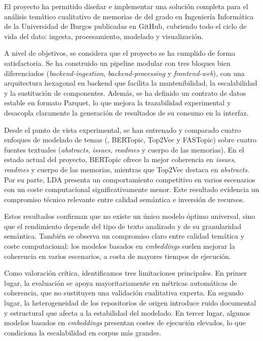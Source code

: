 
El proyecto \nombreProyecto ha permitido diseñar e implementar una solución
completa para el análisis temático cualitativo de memorias de 
del grado en Ingeniería Informática de la Universidad de Burgos publicadas en
GitHub, cubriendo todo el ciclo de vida del dato: ingesta, procesamiento,
modelado y visualización.

A nivel de objetivos, se considera que el proyecto se ha cumplido de forma
satisfactoria. Se ha construido un \gls{pipeline} modular con tres bloques bien
diferenciados (\textit{backend-ingestion}, \textit{backend-processing} y
\textit{frontend-web}), con una arquitectura hexagonal en backend que facilita
la mantenibilidad, la escalabilidad y la sustitución de componentes. Además, se
ha definido un contrato de datos estable en formato Parquet, lo que mejora la
trazabilidad experimental y desacopla claramente la generación de resultados de
su consumo en la interfaz.

Desde el punto de vista experimental, se han entrenado y comparado cuatro
enfoques de modelado de temas (, BERTopic, Top2Vec y FASTopic)
sobre cuatro fuentes textuales (\textit{abstracts}, \textit{issues},
\textit{readmes} y cuerpo de las memorias). En el estado actual del proyecto,
BERTopic ofrece la mejor coherencia en \textit{issues}, \textit{readmes} y
cuerpo de las memorias, mientras que Top2Vec destaca en \textit{abstracts}. Por
su parte, LDA presenta un comportamiento competitivo en varios escenarios con
un coste computacional significativamente menor. Este resultado evidencia un
compromiso técnico relevante entre calidad semántica e inversión de recursos.

Estos resultados confirman que no existe un único modelo óptimo universal, sino
que el rendimiento depende del tipo de texto analizado y de su granularidad
semántica. También se observa un compromiso claro entre calidad temática y
coste computacional: los modelos basados en \textit{embeddings} suelen mejorar
la coherencia en varios escenarios, a costa de mayores tiempos de ejecución.

Como valoración crítica, identificamos tres limitaciones principales. En primer
lugar, la evaluación se apoya mayoritariamente en métricas automáticas de
coherencia, que no sustituyen una validación cualitativa experta. En segundo
lugar, la heterogeneidad de los repositorios de origen introduce ruido
documental y estructural que afecta a la estabilidad del modelado. En tercer
lugar, algunos modelos basados en \textit{embeddings} presentan costes de
ejecución elevados, lo que condiciona la escalabilidad en corpus más grandes.

